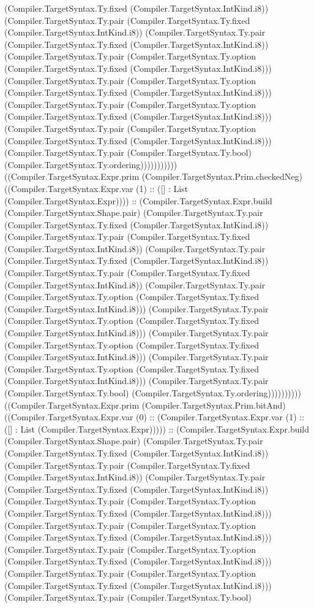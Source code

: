 \documentclass[11pt]{article}
\begin{document}
(Compiler.TargetSyntax.Ty.fixed (Compiler.TargetSyntax.IntKind.i8)) (Compiler.TargetSyntax.Ty.pair (Compiler.TargetSyntax.Ty.fixed (Compiler.TargetSyntax.IntKind.i8)) (Compiler.TargetSyntax.Ty.pair (Compiler.TargetSyntax.Ty.fixed (Compiler.TargetSyntax.IntKind.i8)) (Compiler.TargetSyntax.Ty.pair (Compiler.TargetSyntax.Ty.option (Compiler.TargetSyntax.Ty.fixed (Compiler.TargetSyntax.IntKind.i8))) (Compiler.TargetSyntax.Ty.pair (Compiler.TargetSyntax.Ty.option (Compiler.TargetSyntax.Ty.fixed (Compiler.TargetSyntax.IntKind.i8))) (Compiler.TargetSyntax.Ty.pair (Compiler.TargetSyntax.Ty.option (Compiler.TargetSyntax.Ty.fixed (Compiler.TargetSyntax.IntKind.i8))) (Compiler.TargetSyntax.Ty.pair (Compiler.TargetSyntax.Ty.option (Compiler.TargetSyntax.Ty.fixed (Compiler.TargetSyntax.IntKind.i8))) (Compiler.TargetSyntax.Ty.pair (Compiler.TargetSyntax.Ty.bool) (Compiler.TargetSyntax.Ty.ordering))))))))))) ((Compiler.TargetSyntax.Expr.prim (Compiler.TargetSyntax.Prim.checkedNeg) ((Compiler.TargetSyntax.Expr.var (1) :: ([] : List (Compiler.TargetSyntax.Expr)))) :: (Compiler.TargetSyntax.Expr.build (Compiler.TargetSyntax.Shape.pair) (Compiler.TargetSyntax.Ty.pair (Compiler.TargetSyntax.Ty.fixed (Compiler.TargetSyntax.IntKind.i8)) (Compiler.TargetSyntax.Ty.pair (Compiler.TargetSyntax.Ty.fixed (Compiler.TargetSyntax.IntKind.i8)) (Compiler.TargetSyntax.Ty.pair (Compiler.TargetSyntax.Ty.fixed (Compiler.TargetSyntax.IntKind.i8)) (Compiler.TargetSyntax.Ty.pair (Compiler.TargetSyntax.Ty.fixed (Compiler.TargetSyntax.IntKind.i8)) (Compiler.TargetSyntax.Ty.pair (Compiler.TargetSyntax.Ty.option (Compiler.TargetSyntax.Ty.fixed (Compiler.TargetSyntax.IntKind.i8))) (Compiler.TargetSyntax.Ty.pair (Compiler.TargetSyntax.Ty.option (Compiler.TargetSyntax.Ty.fixed (Compiler.TargetSyntax.IntKind.i8))) (Compiler.TargetSyntax.Ty.pair (Compiler.TargetSyntax.Ty.option (Compiler.TargetSyntax.Ty.fixed (Compiler.TargetSyntax.IntKind.i8))) (Compiler.TargetSyntax.Ty.pair (Compiler.TargetSyntax.Ty.option (Compiler.TargetSyntax.Ty.fixed (Compiler.TargetSyntax.IntKind.i8))) (Compiler.TargetSyntax.Ty.pair (Compiler.TargetSyntax.Ty.bool) (Compiler.TargetSyntax.Ty.ordering)))))))))) ((Compiler.TargetSyntax.Expr.prim (Compiler.TargetSyntax.Prim.bitAnd) ((Compiler.TargetSyntax.Expr.var (0) :: (Compiler.TargetSyntax.Expr.var (1) :: ([] : List (Compiler.TargetSyntax.Expr))))) :: (Compiler.TargetSyntax.Expr.build (Compiler.TargetSyntax.Shape.pair) (Compiler.TargetSyntax.Ty.pair (Compiler.TargetSyntax.Ty.fixed (Compiler.TargetSyntax.IntKind.i8)) (Compiler.TargetSyntax.Ty.pair (Compiler.TargetSyntax.Ty.fixed (Compiler.TargetSyntax.IntKind.i8)) (Compiler.TargetSyntax.Ty.pair (Compiler.TargetSyntax.Ty.fixed (Compiler.TargetSyntax.IntKind.i8)) (Compiler.TargetSyntax.Ty.pair (Compiler.TargetSyntax.Ty.option (Compiler.TargetSyntax.Ty.fixed (Compiler.TargetSyntax.IntKind.i8))) (Compiler.TargetSyntax.Ty.pair (Compiler.TargetSyntax.Ty.option (Compiler.TargetSyntax.Ty.fixed (Compiler.TargetSyntax.IntKind.i8))) (Compiler.TargetSyntax.Ty.pair (Compiler.TargetSyntax.Ty.option (Compiler.TargetSyntax.Ty.fixed (Compiler.TargetSyntax.IntKind.i8))) (Compiler.TargetSyntax.Ty.pair (Compiler.TargetSyntax.Ty.option (Compiler.TargetSyntax.Ty.fixed (Compiler.TargetSyntax.IntKind.i8))) (Compiler.TargetSyntax.Ty.pair (Compiler.TargetSyntax.Ty.bool) 
\end{document}
